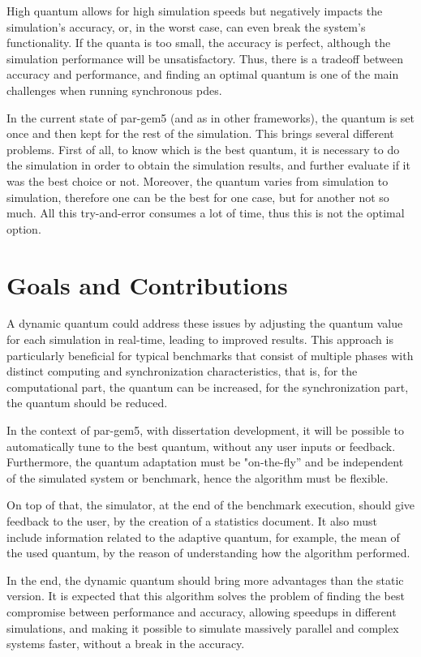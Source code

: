 High quantum allows for high simulation speeds but negatively impacts the simulation's accuracy, or, in the worst case, can even break the system's 
functionality. If the quanta is too small, the accuracy is perfect, although the simulation performance will be unsatisfactory. Thus, there is a 
tradeoff between accuracy and performance, and finding an optimal quantum is one of the main challenges when running synchronous \gls{pdes}.

In the current state of par-gem5 (and as in other frameworks), the quantum is set once and then kept for the rest of the simulation. This brings 
several different problems. First of all, to know which is the best quantum, it is necessary to do the simulation in order to obtain the simulation 
results, and further evaluate if it was the best choice or not. Moreover, the quantum varies from simulation to simulation, therefore one can be the 
best for one case, but for another not so much. All this try-and-error consumes a lot of time, thus this is not the optimal option. 

\section{Goals and Contributions}

A dynamic quantum could address these issues by adjusting the quantum value for each simulation in real-time, leading to improved results. 
This approach is particularly beneficial for typical benchmarks that consist of multiple phases with distinct computing and synchronization 
characteristics, that is, for the computational part, the quantum can be increased, for the synchronization part, the quantum should be reduced. 

In the context of par-gem5, with dissertation development, it will be possible to automatically tune to the best quantum, without any user inputs or 
feedback. Furthermore, the quantum adaptation must be "on-the-fly” and be independent of the simulated system or benchmark, hence the algorithm 
must be flexible. 

On top of that, the simulator, at the end of the benchmark execution, should give feedback to the user, by the creation of a statistics document. 
It also must include information related to the adaptive quantum, for example, the mean of the used quantum, by the reason of understanding how 
the algorithm performed.

 In the end, the dynamic quantum should bring more advantages than the static version. It is expected that this algorithm solves the problem of 
 finding the best compromise between performance and accuracy, allowing speedups in different simulations, and making it possible to simulate 
 massively parallel and complex systems faster, without a break in the accuracy. 

